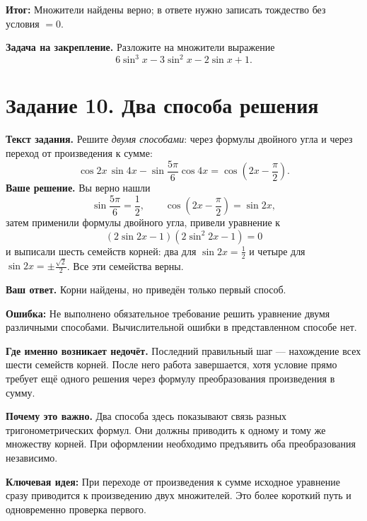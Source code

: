 \documentclass[a4paper,11pt]{article}
\newcommand{\errorlabel}{\textcolor{signal}{\textbf{Ошибка:}}}
\newcommand{\idealabel}{\textcolor{idea}{\textbf{Ключевая идея:}}}
\newcommand{\resultlabel}{\textcolor{accent}{\textbf{Итог:}}}
\begin{document}
\resultlabel{} Множители найдены верно; в ответе нужно записать тождество без условия \(=0\).

\textbf{Задача на закрепление.} Разложите на множители выражение
\[
6\sin^3 x-3\sin^2 x-2\sin x+1.
\]
\newpage
{}\label{task:10}
\section*{Задание 10. Два способа решения}
\textbf{Текст задания.} Решите \emph{двумя способами}: через формулы двойного угла и через переход от произведения к сумме:
\[
\cos 2x\,\sin 4x-\sin\frac{5\pi}{6}\cos 4x
=\cos\left(2x-\frac{\pi}{2}\right).
\]
\textbf{Ваше решение.} Вы верно нашли
\[
\sin\frac{5\pi}{6}=\frac12,\qquad
\cos\left(2x-\frac{\pi}{2}\right)=\sin 2x,
\]
затем применили формулы двойного угла, привели уравнение к
\[
(2\sin 2x-1)(2\sin^2 2x-1)=0
\]
и выписали шесть семейств корней: два для \(\sin 2x=\frac12\) и четыре для \(\sin 2x=\pm\frac{\sqrt2}{2}\). Все эти семейства верны.

\textbf{Ваш ответ.} Корни найдены, но приведён только первый способ.

\errorlabel{} Не выполнено обязательное требование решить уравнение двумя различными способами. Вычислительной ошибки в представленном способе нет.

\textbf{Где именно возникает недочёт.} Последний правильный шаг --- нахождение всех шести семейств корней. После него работа завершается, хотя условие прямо требует ещё одного решения через формулу преобразования произведения в сумму.

\textbf{Почему это важно.} Два способа здесь показывают связь разных тригонометрических формул. Они должны приводить к одному и тому же множеству корней. При оформлении необходимо предъявить оба преобразования независимо.

\idealabel{} При переходе от произведения к сумме исходное уравнение сразу приводится к произведению двух множителей. Это более короткий путь и одновременно проверка первого.
\end{document}
